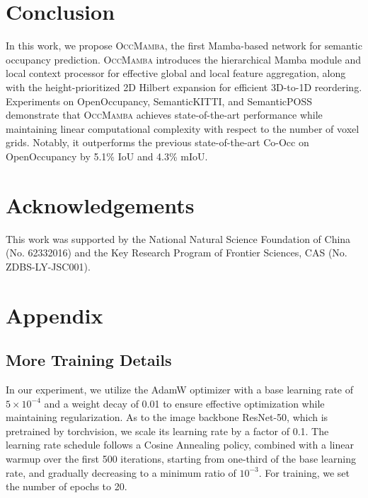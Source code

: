 \documentclass[10pt,twocolumn,letterpaper]{article}
\newcommand{\methodname}{\textsc{OccMamba}}
\begin{document}

\section{Conclusion}

In this work, we propose \methodname{}, the first Mamba-based network for semantic occupancy prediction. \methodname{} introduces the hierarchical Mamba module and local context processor for effective global and local feature aggregation, along with the height-prioritized 2D Hilbert expansion for efficient 3D-to-1D reordering. Experiments on OpenOccupancy, SemanticKITTI, and SemanticPOSS demonstrate that \methodname{} achieves state-of-the-art performance while maintaining linear computational complexity with respect to the number of voxel grids. Notably, it outperforms the previous state-of-the-art Co-Occ on OpenOccupancy by 5.1\% IoU and 4.3\% mIoU.

\section*{Acknowledgements}

This work was supported by the National Natural Science Foundation of China (No. 62332016) and the Key Research Program of Frontier Sciences, CAS (No. ZDBS-LY-JSC001).




\appendix

\section{Appendix}

\subsection{More Training Details}

In our experiment, we utilize the AdamW optimizer with a base learning rate of $5 \times 10^{-4}$ and a weight decay of 0.01 to ensure effective optimization while maintaining regularization. As to the image backbone ResNet-50, which is pretrained by torchvision, we scale its learning rate by a factor of 0.1. The learning rate schedule follows a Cosine Annealing policy, combined with a linear warmup over the first 500 iterations, starting from one-third of the base learning rate, and gradually decreasing to a minimum ratio of $10^{-3}$. For training, we set the number of epochs to 20.
\end{document}
